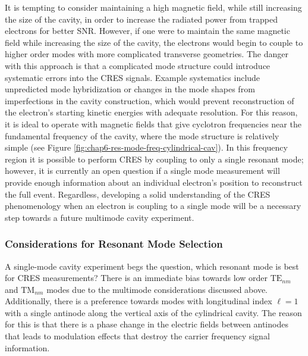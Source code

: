 It is tempting to consider maintaining a high magnetic field, while still increasing the size of the cavity, in order to increase the radiated power from trapped electrons for better SNR. However, if one were to maintain the same magnetic field while increasing the size of the cavity, the electrons would begin to couple to higher order modes with more complicated transverse geometries. The danger with this approach is that a complicated mode structure could introduce systematic errors into the CRES signals. Example systematics include unpredicted mode hybridization or changes in the mode shapes from imperfections in the cavity construction, which would prevent reconstruction of the electron's starting kinetic energies with adequate resolution. For this reason, it is ideal to operate with magnetic fields that give cyclotron frequencies near the fundamental frequency of the cavity, where the mode structure is relatively simple (see Figure \ref{fig:chap6-res-mode-freq-cylindrical-cav}). In this frequency region it is possible to perform CRES by coupling to only a single resonant mode; however, it is currently an open question if a single mode measurement will provide enough information about an individual electron's position to reconstruct the full event. Regardless, developing a solid understanding of the CRES phenomenology when an electron is coupling to a single mode will be a necessary step towards a future multimode cavity experiment.

\subsubsection*{Considerations for Resonant Mode Selection}

A single-mode cavity experiment begs the question, which resonant mode is best for CRES measurements? There is an immediate bias towards low order $\mathrm{TE}_{nm}$ and $\mathrm{TM}_{nm}$ modes due to the multimode considerations discussed above. Additionally, there is a preference towards modes with longitudinal index $\ell=1$ with a single antinode along the vertical axis of the cylindrical cavity. The reason for this is that there is a phase change in the electric fields between antinodes that leads to modulation effects that destroy the carrier frequency signal information. 

